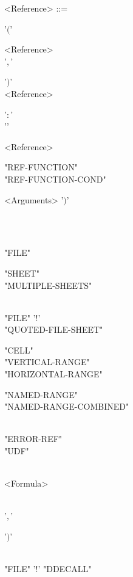 \begin{grammar}
		<Reference> ::= \begin{syntdiag}[\footnotesize\sdlengths]
		\begin{stack} '$($' \begin{rep} <Reference> \\  '$,$' \end{rep} '$)$' \\
		<Reference> \begin{stack} '$:$' \\ '' \end{stack} <Reference> \\
		\begin{stack} "REF-FUNCTION" \\ "REF-FUNCTION-COND" \end{stack} <Arguments> '$)$' \\
		\begin{stack}
			\\
			\begin{stack} \\ "FILE" \end{stack} \begin{stack} "SHEET" \\ "MULTIPLE-SHEETS" \end{stack} \\
			"FILE" '$!$' \\
			"QUOTED-FILE-SHEET"
		\end{stack}
		\begin{stack}
			"CELL" \\
			"VERTICAL-RANGE" \\
			"HORIZONTAL-RANGE" \\
			\begin{stack} "NAMED-RANGE" \\ "NAMED-RANGE-COMBINED" \end{stack} \\
			"ERROR-REF" \\
			"UDF" \begin{rep} \begin{stack} \\ <Formula> \end{stack} \\  '$,$' \end{rep} '$)$'
		\end{stack}
		\\"FILE" '$!$' "DDECALL"
		\end{stack}
		\end{syntdiag}
	\end{grammar}